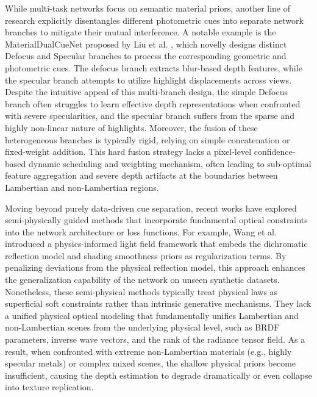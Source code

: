 While multi-task networks focus on semantic material priors, another line of research explicitly disentangles different photometric cues into separate network branches to mitigate their mutual interference. A notable example is the MaterialDualCueNet proposed by Liu et al. , which novelly designs distinct Defocus and Specular branches to process the corresponding geometric and photometric cues. The defocus branch extracts blur-based depth features, while the specular branch attempts to utilize highlight displacements across views. Despite the intuitive appeal of this multi-branch design, the simple Defocus branch often struggles to learn effective depth representations when confronted with severe specularities, and the specular branch suffers from the sparse and highly non-linear nature of highlights. Moreover, the fusion of these heterogeneous branches is typically rigid, relying on simple concatenation or fixed-weight addition. This hard fusion strategy lacks a pixel-level confidence-based dynamic scheduling and weighting mechanism, often leading to sub-optimal feature aggregation and severe depth artifacts at the boundaries between Lambertian and non-Lambertian regions.

Moving beyond purely data-driven cue separation, recent works have explored semi-physically guided methods that incorporate fundamental optical constraints into the network architecture or loss functions. For example, Wang et al.  introduced a physics-informed light field framework that embeds the dichromatic reflection model and shading smoothness priors as regularization terms. By penalizing deviations from the physical reflection model, this approach enhances the generalization capability of the network on unseen synthetic datasets. Nonetheless, these semi-physical methods typically treat physical laws as superficial soft constraints rather than intrinsic generative mechanisms. They lack a unified physical optical modeling that fundamentally unifies Lambertian and non-Lambertian scenes from the underlying physical level, such as BRDF parameters, inverse wave vectors, and the rank of the radiance tensor field. As a result, when confronted with extreme non-Lambertian materials (e.g., highly specular metals) or complex mixed scenes, the shallow physical priors become insufficient, causing the depth estimation to degrade dramatically or even collapse into texture replication.

